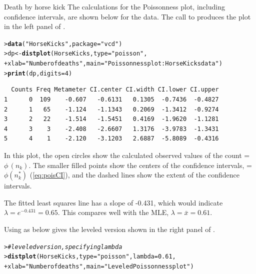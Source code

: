 \documentclass[10pt,krantz2]{krantz}\usepackage[]{graphicx}\usepackage[]{color}
\makeatletter
\newcommand{\hlnum}[1]{\textcolor[rgb]{0.686,0.059,0.569}{#1}}%
\newcommand{\hlstr}[1]{\textcolor[rgb]{0.192,0.494,0.8}{#1}}%
\newcommand{\hlcom}[1]{\textcolor[rgb]{0.678,0.584,0.686}{\textit{#1}}}%
\newcommand{\hlstd}[1]{\textcolor[rgb]{0.345,0.345,0.345}{#1}}%
\newcommand{\hlkwb}[1]{\textcolor[rgb]{0.69,0.353,0.396}{#1}}%
\newcommand{\hlkwc}[1]{\textcolor[rgb]{0.333,0.667,0.333}{#1}}%
\newcommand{\hlkwd}[1]{\textcolor[rgb]{0.737,0.353,0.396}{\textbf{#1}}}%
\newenvironment{kframe}{%
 \def\at@end@of@kframe{}%
 \ifinner\ifhmode%
  \def\at@end@of@kframe{\end{minipage}}%
  \begin{minipage}{\columnwidth}%
 \fi\fi%
 \def\FrameCommand##1{\hskip\@totalleftmargin \hskip-\fboxsep
 \colorbox{shadecolor}{##1}\hskip-\fboxsep
     \hskip-\linewidth \hskip-\@totalleftmargin \hskip\columnwidth}%
 \MakeFramed {\advance\hsize-\width
   \@totalleftmargin\z@ \linewidth\hsize
   \@setminipage}}%
 {\par\unskip\endMakeFramed%
 \at@end@of@kframe}
\newenvironment{knitrout}{}{} %
\renewenvironment{knitrout}{\small\renewcommand{\baselinestretch}{.85}}{} %
\makeatother
\begin{document}
\begin{Example}[horsekick4]{Death by horse kick}
The calculations for the Poissonness plot, including confidence
intervals, are shown below for the  data.  The
call to 
produces the plot in the left panel of
.

\begin{knitrout}
\color{fgcolor}\begin{kframe}
\begin{alltt}
\hlstd{> }\hlkwd{data}\hlstd{(}\hlstr{"HorseKicks"}\hlstd{,} \hlkwc{package}\hlstd{=}\hlstr{"vcd"}\hlstd{)}
\hlstd{> }\hlstd{dp} \hlkwb{<-} \hlkwd{distplot}\hlstd{(HorseKicks,} \hlkwc{type} \hlstd{=} \hlstr{"poisson"}\hlstd{,}
\hlstd{+ }  \hlkwc{xlab}\hlstd{=}\hlstr{"Number of deaths"}\hlstd{,} \hlkwc{main}\hlstd{=}\hlstr{"Poissonness plot: HorseKicks data"}\hlstd{)}
\hlstd{> }\hlkwd{print}\hlstd{(dp,} \hlkwc{digits}\hlstd{=}\hlnum{4}\hlstd{)}
\end{alltt}
\begin{verbatim}
  Counts Freq Metameter CI.center CI.width CI.lower CI.upper
1      0  109    -0.607   -0.6131   0.1305  -0.7436  -0.4827
2      1   65    -1.124   -1.1343   0.2069  -1.3412  -0.9274
3      2   22    -1.514   -1.5451   0.4169  -1.9620  -1.1281
4      3    3    -2.408   -2.6607   1.3176  -3.9783  -1.3431
5      4    1    -2.120   -3.1203   2.6887  -5.8089  -0.4316
\end{verbatim}
\end{kframe}
\end{knitrout}
In this plot, the open circles show the calculated
observed values of the count  = $\phi \,  ( n_k )$.
The smaller filled points show the centers of the confidence intervals,
 = $\phi \left( n_k^{*}\right)$ (\eqref{eq:poisCI}),
and the dashed lines show the extent of the confidence intervals.

The fitted least squares line has a slope of -0.431, which would
indicate $\lambda = e^{-0.431} = 0.65$.  This compares well with the MLE,
$\lambda = \bar{x} = 0.61$.

Using  as below gives the leveled version shown in
the right panel of .
\begin{knitrout}
\color{fgcolor}\begin{kframe}
\begin{alltt}
\hlstd{> }\hlcom{# leveled version, specifying lambda}
\hlstd{> }\hlkwd{distplot}\hlstd{(HorseKicks,} \hlkwc{type} \hlstd{=} \hlstr{"poisson"}\hlstd{,} \hlkwc{lambda} \hlstd{=} \hlnum{0.61}\hlstd{,}
\hlstd{+ }  \hlkwc{xlab}\hlstd{=}\hlstr{"Number of deaths"}\hlstd{,} \hlkwc{main}\hlstd{=}\hlstr{"Leveled Poissonness plot"}\hlstd{)}
\end{alltt}
\end{kframe}
\end{knitrout}


\end{Example}
\end{document}
